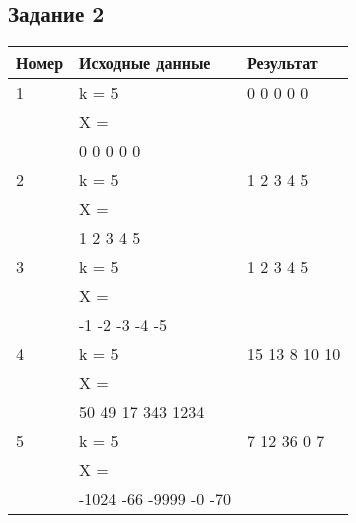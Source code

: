 \hfil
\begin{minipage}[t]{0.5\textwidth}

\subsection*{\centering Задание 2}
\begin{tabular}{|l|l|l|}
    \hline
    Номер & Исходные данные & Результат\\[2ex]
      \hline
      1 & k = 5     & 0 0 0 0 0 \\
        & X =       & \\
        & 0 0 0 0 0 & \\
      \hline
      2 & k = 5     & 1 2 3 4 5 \\
        & X =       & \\
        & 1 2 3 4 5 & \\
      \hline
      3 & k = 5          & 1 2 3 4 5 \\
        & X =            & \\
        & -1 -2 -3 -4 -5 & \\
      \hline
      4 & k = 5             & 15 13 8 10 10 \\
        & X =               & \\
        & 50 49 17 343 1234 & \\
      \hline
      5 & k = 5                  & 7 12 36 0 7 \\
        & X =                    & \\
        & -1024 -66 -9999 -0 -70 & \\
      \hline
\end{tabular}

\end{minipage}